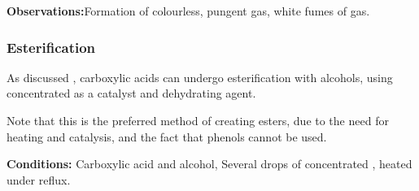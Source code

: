 				\vspace{0.75em}
				\vbox{\textbf{Observations:}\tabto{35mm}Formation of colourless, pungent  gas,
											\tabto{35mm}white fumes of  gas.}




			\subsubsection{Esterification}

				As discussed \hyperlink{EsterificationCarboxylicAcids}{}, carboxylic acids can undergo esterification
				with alcohols, using concentrated  as a catalyst and dehydrating agent.

				Note that this is  the preferred method of creating esters, due to the need for heating and catalysis, and the fact
				that phenols cannot be used.

				\vspace{1.5em}
				\vbox{\textbf{Conditions:}	\tabto{35mm}Carboxylic acid and alcohol,
											\tabto{35mm}Several drops of concentrated , heated under reflux.}



